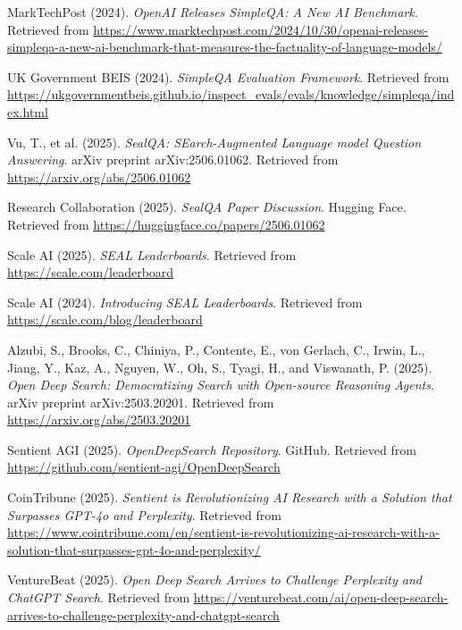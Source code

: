 \documentclass[10pt,a4paper]{article}
\begin{document}
\begin{thebibliography}{99}
MarkTechPost (2024).
\textit{OpenAI Releases SimpleQA: A New AI Benchmark}.
Retrieved from \url{https://www.marktechpost.com/2024/10/30/openai-releases-simpleqa-a-new-ai-benchmark-that-measures-the-factuality-of-language-models/}

UK Government BEIS (2024).
\textit{SimpleQA Evaluation Framework}.
Retrieved from \url{https://ukgovernmentbeis.github.io/inspect_evals/evals/knowledge/simpleqa/index.html}

Vu, T., et al. (2025).
\textit{SealQA: SEarch-Augmented Language model Question Answering}.
arXiv preprint arXiv:2506.01062.
Retrieved from \url{https://arxiv.org/abs/2506.01062}

Research Collaboration (2025).
\textit{SealQA Paper Discussion}.
Hugging Face. Retrieved from \url{https://huggingface.co/papers/2506.01062}

Scale AI (2025).
\textit{SEAL Leaderboards}.
Retrieved from \url{https://scale.com/leaderboard}

Scale AI (2024).
\textit{Introducing SEAL Leaderboards}.
Retrieved from \url{https://scale.com/blog/leaderboard}


Alzubi, S., Brooks, C., Chiniya, P., Contente, E., von Gerlach, C., Irwin, L., Jiang, Y., Kaz, A., Nguyen, W., Oh, S., Tyagi, H., and Viswanath, P. (2025).
\textit{Open Deep Search: Democratizing Search with Open-source Reasoning Agents}.
arXiv preprint arXiv:2503.20201.
Retrieved from \url{https://arxiv.org/abs/2503.20201}

Sentient AGI (2025).
\textit{OpenDeepSearch Repository}.
GitHub. Retrieved from \url{https://github.com/sentient-agi/OpenDeepSearch}

CoinTribune (2025).
\textit{Sentient is Revolutionizing AI Research with a Solution that Surpasses GPT-4o and Perplexity}.
Retrieved from \url{https://www.cointribune.com/en/sentient-is-revolutionizing-ai-research-with-a-solution-that-surpasses-gpt-4o-and-perplexity/}

VentureBeat (2025).
\textit{Open Deep Search Arrives to Challenge Perplexity and ChatGPT Search}.
Retrieved from \url{https://venturebeat.com/ai/open-deep-search-arrives-to-challenge-perplexity-and-chatgpt-search}


\end{thebibliography}
\end{document}
